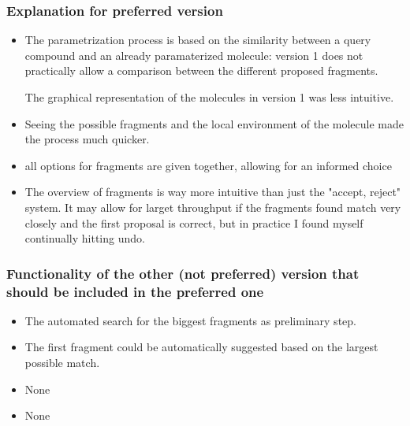 \subsubsection{Explanation for preferred version}
\begin{itemize}
\item The parametrization process is based on the similarity between a query compound and an already paramaterized molecule: version 1 does not practically allow a comparison between the different proposed fragments.


The graphical representation of the molecules in version 1 was less intuitive.

\item Seeing the possible fragments and the local environment of the molecule made the process much quicker. 

\item all options for fragments are given together, allowing for an informed choice

\item The overview of fragments is way more intuitive than just the "accept, reject" system. It may allow for larget throughput if the fragments found match very closely and the first proposal is correct, but in practice I found myself continually hitting undo.

\end{itemize}


\subsubsection{Functionality of the other (not preferred) version that should be included in the preferred one}
\begin{itemize}
\item The automated search for the biggest fragments as preliminary step.

\item The first fragment could be automatically suggested based on the largest possible match.

\item None

\item None

\end{itemize}


